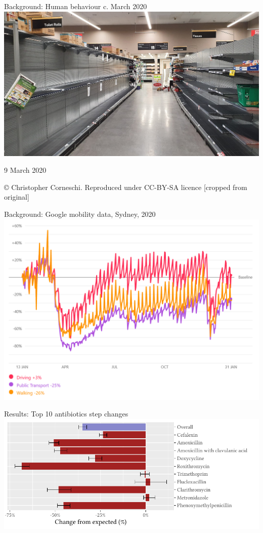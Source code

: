 \documentclass[aspectratio=169,12pt]{beamer} %
\begin{document}
\begin{frame}{Background: Human behaviour c. March 2020}
\centering
\includegraphics[height=0.75\textheight]
	{ref/toilet-paper-crop.jpg}

	\tiny 9 March 2020

	\copyright\: Christopher Corneschi.
	Reproduced under CC-BY-SA licence [cropped from original]
\end{frame}

\begin{frame}{Background: Google mobility data, Sydney, 2020}
\centering
\includegraphics[height=0.8\textheight]
        {ref/google-mobility-20210202.PNG}
\end{frame}

\begin{frame}{Results: Top 10 antibiotics step changes}
\centering
\includegraphics{ref/latex-j01arimatab-1.pdf}
\end{frame}
\end{document}
